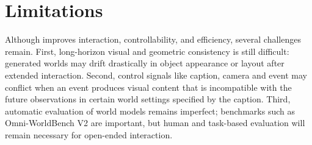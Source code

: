 \section{Limitations}

Although \method{} improves interaction, controllability, and efficiency,
several challenges remain.
First, long-horizon visual and geometric consistency is still difficult:
generated worlds may drift drastically in object appearance or layout
after extended interaction.
Second, control signals like caption, camera and event may conflict
when an event produces visual content that is incompatible with the future observations in certain world settings specified by the caption.
Third, automatic evaluation of world models remains imperfect;
benchmarks such as Omni-WorldBench V2 are important,
but human and task-based evaluation will remain necessary for open-ended interaction.